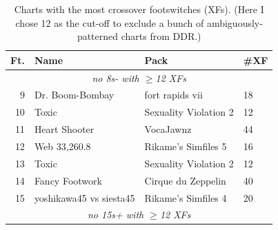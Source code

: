 \documentclass[10pt]{sigplanconf}
\begin{document}
\begin{table}[h!]
	\begin{center}
		\small
	\begin{tabular}{r|l|l|l}
		\bf Ft. & \bf Name & \bf Pack & \bf \#XF \\
		\hline
		\multicolumn{4}{c}{\em no 8s- with $\ge$12 XFs} \\
		 9 & Dr. Boom-Bombay   & fort rapids vii            & 18 \\
		10 & Toxic             & Sexuality Violation 2      & 12 \\
		11 & Heart Shooter     & VocaJawnz                  & 44 \\
		12 & Web 33,260.8      & Rikame's Simfiles 5        & 16 \\
		13 & Toxic             & Sexuality Violation 2      & 12 \\
		14 & Fancy Footwork    & Cirque du Zeppelin         & 40 \\
		15 & yoshikawa45 vs siesta45 & Rikame's Simfiles 4  & 20 \\
		\multicolumn{4}{c}{\em no 15s+ with $\ge$12 XFs} \\
	\end{tabular}
	\end{center}
	\caption{Charts with the most crossover footswitches (XFs). (Here I chose 12 as the cut-off to exclude a bunch of ambiguously-patterned charts from DDR.)}
	\label{tab:chart-xf}
\end{table}
\end{document}
